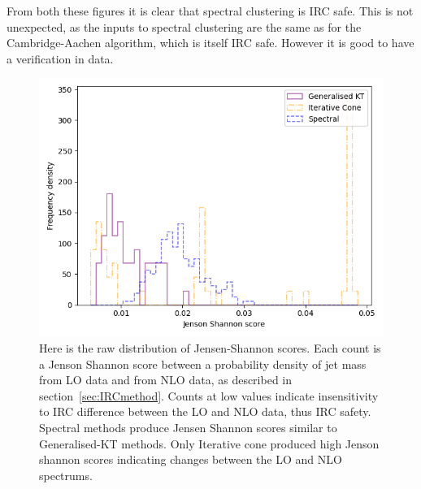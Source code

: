From both these figures it is clear that spectral clustering is IRC safe.
This is not unexpected, as the inputs to spectral clustering
are the same as for the Cambridge-Aachen algorithm, 
which is itself IRC safe.
However it is good to have a verification in data.

\begin{figure}[htp]
    \begin{minipage}[c]{0.6\textwidth}
    \includegraphics[width=1.\textwidth]{graphics/JensenShannon_unnormed.png}
    \end{minipage}\hfill
    \begin{minipage}[c]{0.35\textwidth}
    \caption{Here is the raw distribution of Jensen-Shannon scores.
        Each count is a Jenson Shannon score between a probability density of jet mass from LO data and
        from NLO data, as described in section~\ref{sec:IRCmethod}.
        Counts at low values indicate insensitivity to IRC difference between the LO and NLO data,
        thus IRC safety.
        Spectral methods produce Jensen Shannon scores similar to Generalised-KT
        methods. Only Iterative cone produced high Jenson shannon scores indicating changes
        between the LO and NLO spectrums.
     }\label{fig:unnormedJS}
    \end{minipage}
\end{figure}    

